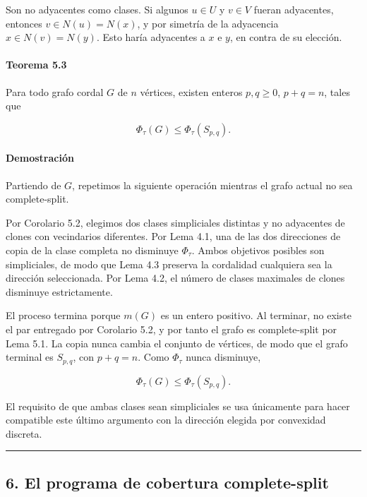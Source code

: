\documentclass[spanish,11pt,a4paper]{article}
\begin{document}
Son no adyacentes como clases. Si algunos \(u\in U\) y \(v\in V\) fueran
adyacentes, entonces \(v\in N(u)=N(x)\), y por simetría de la adyacencia
\(x\in N(v)=N(y)\). Esto haría adyacentes a \(x\) e \(y\), en contra de
su elección.

\paragraph{Teorema 5.3}\label{teorema-5.3}

Para todo grafo cordal \(G\) de \(n\) vértices, existen enteros
\(p,q\ge0\), \(p+q=n\), tales que

\[
\boxed{
\Phi_\tau(G)\le\Phi_\tau(S_{p,q})
}.
\]

\paragraph{Demostración}\label{demostraciuxf3n-7}

Partiendo de \(G\), repetimos la siguiente operación mientras el grafo
actual no sea complete-split.

Por Corolario 5.2, elegimos dos clases simpliciales distintas y no
adyacentes de clones con vecindarios diferentes. Por Lema 4.1, una de
las dos direcciones de copia de la clase completa no disminuye
\(\Phi_\tau\). Ambos objetivos posibles son simpliciales, de modo que
Lema 4.3 preserva la cordalidad cualquiera sea la dirección
seleccionada. Por Lema 4.2, el número de clases maximales de clones
disminuye estrictamente.

El proceso termina porque \(m(G)\) es un entero positivo. Al terminar,
no existe el par entregado por Corolario 5.2, y por tanto el grafo es
complete-split por Lema 5.1. La copia nunca cambia el conjunto de
vértices, de modo que el grafo terminal es \(S_{p,q}\), con \(p+q=n\).
Como \(\Phi_\tau\) nunca disminuye,

\[
\Phi_\tau(G)\le\Phi_\tau(S_{p,q}).
\]

El requisito de que ambas clases sean simpliciales se usa únicamente
para hacer compatible este último argumento con la dirección elegida por
convexidad discreta.

\begin{center}\rule{0.5\linewidth}{0.5pt}\end{center}

\subsection{6. El programa de cobertura
complete-split}\label{el-programa-de-cobertura-complete-split}
\end{document}
